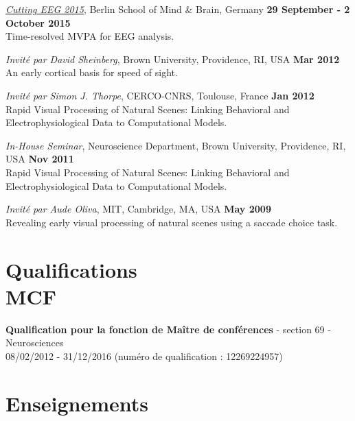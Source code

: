 \documentclass[margin,line]{resume}
\begin{document}
\begin{resume}
	\footnotesize

	\textit{\href{http://www.mind-and-brain.de/cutting-eeg-2015}{Cutting EEG 2015}}, Berlin School of Mind \& Brain, Germany \hfill \textbf{29 September - 2 October 2015}\\
	Time-resolved MVPA for EEG analysis.
	
	\vspace{-2mm} 
	\textit{Invité par David Sheinberg}, Brown University, Providence, RI, USA \hfill \textbf{Mar 2012}\\
	An early cortical basis for speed of sight. 

	\vspace{-2mm} 
	\textit{Invité par Simon J. Thorpe}, CERCO-CNRS, Toulouse, France \hfill \textbf{Jan 2012}\\
	Rapid Visual Processing of Natural Scenes: Linking Behavioral and Electrophysiological Data to Computational Models.

	\vspace{-2mm} 
	\textit{In-House Seminar}, Neuroscience Department, Brown University, Providence, RI, USA \hfill \textbf{Nov 2011}\\
	Rapid Visual Processing of Natural Scenes: Linking Behavioral and Electrophysiological Data to Computational Models.

	\vspace{-2mm} 
	\textit{Invité par Aude Oliva}, MIT, Cambridge, MA, USA \hfill \textbf{May 2009}\\
	Revealing early visual processing of natural scenes using a saccade choice task.

	\normalsize

\vspace{3mm}
\section{\mysidestyle Qualifications\\MCF}
    \textbf{Qualification pour la fonction de Maître de conférences} - section 69 - Neurosciences\\
    08/02/2012 - 31/12/2016 (numéro de qualification : 12269224957)

    
\newpage

\vspace{3mm}
\section{\mysidestyle Enseignements}
	

\end{resume}
\end{document}
